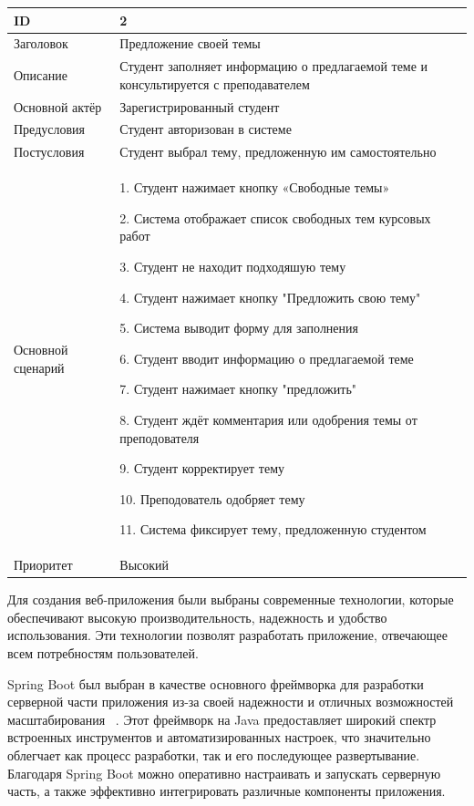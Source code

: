 \documentclass[14pt]{extarticle} %
\begin{document}
\begin{longtable}{|p{3cm}|p{14cm}|}
\hline
ID & 2 \\ \hline
Заголовок & Предложение своей темы\\ \hline
Описание & Студент заполняет информацию о предлагаемой теме и консультируется с преподавателем\\ \hline
Основной актёр & Зарегистрированный студент\\ \hline
Предусловия & Студент авторизован в системе \\ \hline
Постусловия & Студент выбрал тему, предложенную им самостоятельно \\ \hline
Основной сценарий & 
1. Студент нажимает кнопку «Свободные темы»

2. Система отображает список свободных тем курсовых работ

3. Студент не находит подходяшую тему

4. Студент нажимает кнопку "Предложить свою тему"

5. Система выводит форму для заполнения

6. Студент вводит информацию о предлагаемой теме

7. Студент нажимает кнопку "предложить"

8. Студент ждёт комментария или одобрения темы от преподователя

9. Студент корректирует тему

10. Преподователь одобряет тему

11. Система фиксирует тему, предложенную студентом
\\ \hline	
Приоритет & Высокий
\\ \hline	
\end{longtable}




Для создания веб-приложения были выбраны современные технологии, которые обеспечивают высокую производительность, надежность и удобство использования. Эти технологии позволят разработать приложение, отвечающее всем потребностям пользователей. 



Spring Boot был выбран в качестве основного фреймворка для разработки серверной части приложения из-за своей надежности и отличных возможностей масштабирования ~\cite{SpringBoot}. Этот фреймворк на Java предоставляет широкий спектр встроенных инструментов и автоматизированных настроек, что значительно облегчает как процесс разработки, так и его последующее развертывание. Благодаря Spring Boot можно оперативно настраивать и запускать серверную часть, а также эффективно интегрировать различные компоненты приложения.
\end{document}
